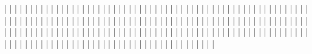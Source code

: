   |                   |
  |                   |
  |                   |
  |                   |
  |                   |
  |                   |
  |                   |
  |                   |
  |                   |
  |                   |
  |                   |
  |                   |
  |                   |
  |                   |
  |                   |
  |                   |
  |                   |
  |                   |
  |                   |
  |                   |
  |                   |
  |                   |
  |                   |
  |                   |
  |                   |
  |                   |
  |                   |
  |                   |
  |                   |
  |                   |
  |                   |
  |                   |
  |                   |
  |                   |
  |                   |
  |                   |
  |                   |
  |                   |
  |                   |
  |                   |
  |                   |
  |                   |
  |                   |
  |                   |
  |                   |
  |                   |
  |                   |
  |                   |
  |                   |
  |                   |
  |                   |
  |                   |
  |                   |
  |                   |
  |                   |
  |                   |
  |                   |
  |                   |
  |                   |
  |                   |
  |                   |
  |                   |
  |                   |
  |                   |
  |                   |
  |                   |
  |                   |
  |                   |
  |                   |
  |                   |
  |                   |
  |                   |
  |                   |
  |                   |
  |                   |
  |                   |
  |                   |
  |                   |
  |                   |
  |                   |
  |                   |
  |                   |
  |                   |
  |                   |
  |                   |
  |                   |
  |                   |
  |                   |
  |                   |
  |                   |
  |                   |
  |                   |
  |                   |
  |                   |
  |                   |
  |                   |
  |                   |
  |                   |
  |                   |
  |                   |
  |                   |
  |                   |
  |                   |
  |                   |
  |                   |
  |                   |
  |                   |
  |                   |
  |                   |
